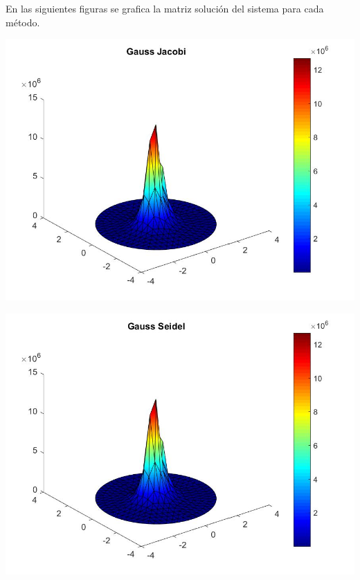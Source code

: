 \documentclass{memoria}
\begin{document}

En las siguientes figuras se grafica la matriz solución del sistema para cada método.


\begin{center}
{\includegraphics[width=16cm]{imagenes/SE/Resultados289_GJ.jpg}}
\end{center}

{\includegraphics[width=16cm]{imagenes/SE/Resultados289_GS.jpg}}
\end{document}
